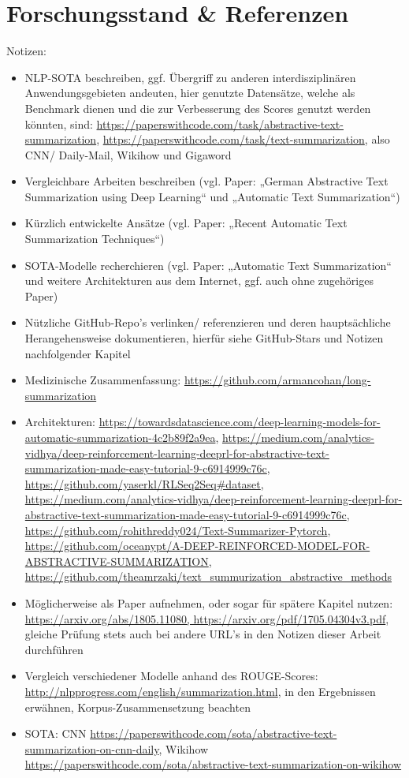 \section{Forschungsstand \& Referenzen}
Notizen:
\begin{itemize}
	\item NLP-SOTA beschreiben, ggf. Übergriff zu anderen interdisziplinären Anwendungsgebieten andeuten, hier genutzte Datensätze, welche als Benchmark dienen und die zur Verbesserung des Scores genutzt werden könnten, sind: \url{https://paperswithcode.com/task/abstractive-text-summarization}, \url{https://paperswithcode.com/task/text-summarization}, also CNN/ Daily-Mail, Wikihow und Gigaword
	\item Vergleichbare Arbeiten beschreiben (vgl. Paper: „German Abstractive Text Summarization using Deep Learning“ und „Automatic Text Summarization“)
	\item Kürzlich entwickelte Ansätze (vgl. Paper: „Recent Automatic Text Summarization Techniques“)
	\item SOTA-Modelle recherchieren (vgl. Paper: „Automatic Text Summarization“ und weitere Architekturen aus dem Internet, ggf. auch ohne zugehöriges Paper)
	\item Nützliche GitHub-Repo's verlinken/ referenzieren und deren hauptsächliche Herangehensweise dokumentieren, hierfür siehe GitHub-Stars und Notizen nachfolgender Kapitel
	\item Medizinische Zusammenfassung: \url{https://github.com/armancohan/long-summarization}
	\item Architekturen: \url{https://towardsdatascience.com/deep-learning-models-for-automatic-summarization-4c2b89f2a9ea}, \url{https://medium.com/analytics-vidhya/deep-reinforcement-learning-deeprl-for-abstractive-text-summarization-made-easy-tutorial-9-c6914999c76c}, \url{https://github.com/yaserkl/RLSeq2Seq#dataset}, \url{https://medium.com/analytics-vidhya/deep-reinforcement-learning-deeprl-for-abstractive-text-summarization-made-easy-tutorial-9-c6914999c76c}, \url{https://github.com/rohithreddy024/Text-Summarizer-Pytorch}, \url{https://github.com/oceanypt/A-DEEP-REINFORCED-MODEL-FOR-ABSTRACTIVE-SUMMARIZATION}, \url{https://github.com/theamrzaki/text_summurization_abstractive_methods}
	\item Möglicherweise als Paper aufnehmen, oder sogar für spätere Kapitel nutzen: \url{https://arxiv.org/abs/1805.11080, https://arxiv.org/pdf/1705.04304v3.pdf}, gleiche Prüfung stets auch bei andere URL's in den Notizen dieser Arbeit durchführen
	\item Vergleich verschiedener Modelle anhand des ROUGE-Scores: \url{http://nlpprogress.com/english/summarization.html}, in den Ergebnissen erwähnen, Korpus-Zusammensetzung beachten
	\item SOTA: CNN \url{https://paperswithcode.com/sota/abstractive-text-summarization-on-cnn-daily}, Wikihow \url{https://paperswithcode.com/sota/abstractive-text-summarization-on-wikihow}
\end{itemize}
